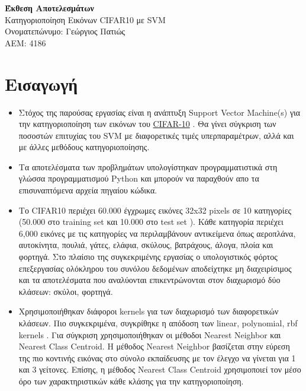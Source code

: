 \documentclass[a4paper,12pt]{article}
\newcommand{\lt}{\latintext}
\newcommand{\gt}{\greektext}
\begin{document}
\begin{titlepage}
    \centering
    \vspace*{1in}
    {\Large \textbf{Έκθεση Αποτελεσμάτων}\\[0.5em]
    Κατηγοριοποίηση Εικόνων \lt CIFAR10 \gt με \lt SVM \gt  \\[1em]}
    {\large Ονοματεπώνυμο: Γεώργιος Πατιώς}\\
    {\large ΑΕΜ: 4186}
    \vspace*{1in}
\end{titlepage}

\tableofcontents
\newpage

\section{Εισαγωγή}
\begin{itemize}
    \item  Στόχος της παρούσας εργασίας είναι η ανάπτυξη \lt Support Vector Machine(s) \gt για την κατηγοριοποίηση των εικόνων του \lt \href{https://www.cs.toronto.edu/~kriz/cifar.html}{CIFAR-10} \gt.
    Θα γίνει σύγκριση των ποσοστών επιτυχίας του \lt SVM \gt με διαφορετικές τιμές υπερπαραμέτρων, αλλά και με άλλες μεθόδους κατηγοριοποίησης.

    \item Tα αποτελέσματα των προβλημάτων υπολογίστηκαν 
    προγραμματιστικά στη γλώσσα προγραμματισμού \lt Python \gt και μπορούν να παραχθούν απο τα 
    επισυναπτόμενα αρχεία πηγαίου κώδικα.

    \item  Το \lt CIFAR10 \gt περιέχει 60.000 έγχρωμες εικόνες \lt 32x32 pixels \gt σε 10 κατηγορίες (50.000 στο \lt training set \gt και 10.000 στο \lt test set \gt).
    Κάθε κατηγορία περιέχει 6,000 εικόνες με τις κατηγορίες να περιλαμβάνουν αντικείμενα όπως αεροπλάνα, αυτοκίνητα, πουλιά, γάτες, ελάφια, σκύλους, βατράχους, άλογα, πλοία και φορτηγά.
    Στο πλαίσιο της συγκεκριμένης εργασίας ο υπολογιστικός φόρτος επεξεργασίας ολόκληρου του συνόλου δεδομένων αποδείχτηκε μη διαχειρίσιμος και 
    τα αποτελέσματα που αναλύονται επικεντρώνονται στον διαχωρισμό δύο κλάσεων: σκύλοι, φορτηγά.

    \item Χρησιμοποιήθηκαν διάφοροι \lt kernels \gt για των διαχωρισμό των διαφορετικών κλάσεων. Πιο συγκεκριμένα, συγκρίθηκε η απόδοση των 
    \lt linear, polynomial, rbf kernels \gt .
    Για σύγκριση χρησιμοποιήθηκαν οι μέθοδοι \lt Nearest Neighbor \gt και \lt Nearest Class Centroid. \gt
    Η μέθοδος \lt Nearest Neighbor \gt βασίζεται στην εύρεση της πιο κοντινής εικόνας στο σύνολο εκπαίδευσης με τον έλεγχο να γίνεται για 1 και 3 γείτονες.
    Επίσης, η μέθοδος \lt Nearest Class Centroid \gt χρησιμοποιεί τον μέσο όρο των χαρακτηριστικών κάθε κλάσης για την κατηγοριοποίηση.

\end{itemize}
\end{document}
